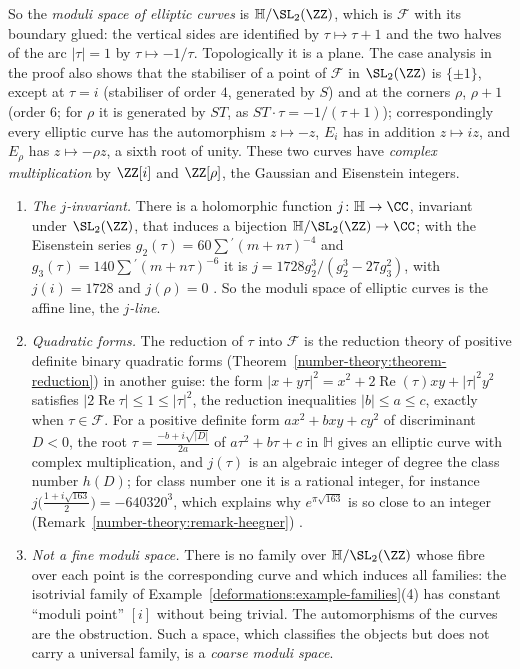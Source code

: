 So the \emph{moduli space of elliptic curves} is $\mathbb{H}/\SL_2(\ZZ)$, which is $\mathcal{F}$ with its boundary glued: the vertical sides are identified by $\tau \mapsto \tau + 1$ and the two halves of the
arc $|\tau| = 1$ by $\tau \mapsto -1/\tau$. Topologically it is a plane. The case analysis in the proof also shows that the stabiliser of a point of $\mathcal{F}$ in $\SL_2(\ZZ)$ is $\{\pm1\}$, except at
$\tau = i$ (stabiliser of order $4$, generated by $S$) and at the corners $\rho$, $\rho + 1$ (order $6$; for $\rho$ it is generated by $ST$, as $ST\cdot\tau = -1/(\tau + 1)$); correspondingly every elliptic curve has the automorphism $z \mapsto -z$, $E_i$ has in addition $z \mapsto iz$, and $E_\rho$ has $z \mapsto -\rho z$, a sixth root of
unity. These two curves have \emph{complex multiplication} by $\ZZ[i]$ and $\ZZ[\rho]$, the Gaussian and Eisenstein integers.

\begin{remark}\label{deformations:remark-elliptic-moduli}
\begin{enumerate}
\item \emph{The $j$-invariant.} There is a holomorphic function $j \colon \mathbb{H} \to \CC$, invariant under $\SL_2(\ZZ)$, that induces a bijection $\mathbb{H}/\SL_2(\ZZ) \to \CC$; with the Eisenstein series
$g_2(\tau) = 60\sum{}^{\prime}(m + n\tau)^{-4}$ and $g_3(\tau) = 140\sum{}^{\prime}(m + n\tau)^{-6}$ it is $j = 1728g_2^3/(g_2^3 - 27g_3^2)$, with $j(i) = 1728$ and $j(\rho) = 0$ \cite[Chapter VII]{serre-arithmetic}. So the moduli
space of elliptic curves is the affine line, the \emph{$j$-line}.
\item \emph{Quadratic forms.} The reduction of $\tau$ into $\mathcal{F}$ is the reduction theory of positive definite binary quadratic forms (Theorem~\ref{number-theory:theorem-reduction}) in another guise:
the form $|x + y\tau|^2 = x^2 + 2\operatorname{Re}(\tau)xy + |\tau|^2y^2$ satisfies $|2\operatorname{Re}\tau| \leq 1 \leq |\tau|^2$, the reduction inequalities $|b| \leq a \leq c$, exactly when $\tau \in \mathcal{F}$. For a
positive definite form $ax^2 + bxy + cy^2$ of discriminant $D < 0$, the root $\tau = \frac{-b + i\sqrt{|D|}}{2a}$ of $a\tau^2 + b\tau + c$ in $\mathbb{H}$ gives an elliptic curve with complex multiplication, and
$j(\tau)$ is an algebraic integer of degree the class number $h(D)$; for class number one it is a rational integer, for instance $j\bigl(\frac{1 + i\sqrt{163}}{2}\bigr) = -640320^3$, which explains why
$e^{\pi\sqrt{163}}$ is so close to an integer (Remark~\ref{number-theory:remark-heegner}) \cite{cox-primes}.
\item \emph{Not a fine moduli space.} There is no family over $\mathbb{H}/\SL_2(\ZZ)$ whose fibre over each point is the corresponding curve and which induces all families: the isotrivial family of
Example~\ref{deformations:example-families}(4) has constant ``moduli point'' $[i]$ without being trivial. The automorphisms of the curves are the obstruction. Such a space, which classifies the objects but
does not carry a universal family, is a \emph{coarse moduli space}.
\end{enumerate}
\end{remark}

